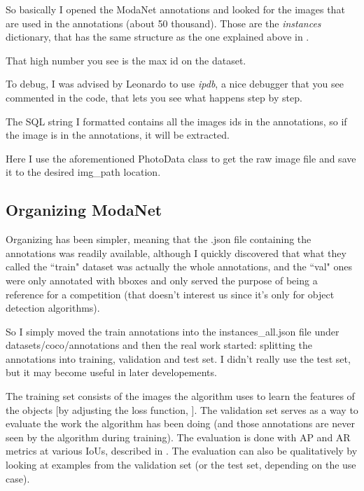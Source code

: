 


So basically I opened the ModaNet annotations and looked for the images that are used in the annotations (about 50 thousand). Those are the \emph{instances} dictionary, that has the same structure as the one explained above in .

That high number you see is the max id on the dataset. 

To debug, I was advised by Leonardo to use \emph{ipdb}, a nice debugger that you see commented in the code, that lets you see what happens step by step.

The SQL string I formatted contains all the images ids in the annotations, so if the image is in the annotations, it will be extracted.



Here I use the aforementioned PhotoData class to get the raw image file and save it to the desired img\_path location.

\subsection{Organizing ModaNet}\label{s:ds-org-mn}

Organizing \modanet has been simpler, meaning that the .json file containing the annotations was readily available, although I quickly discovered that what they called the “train" dataset was actually the whole annotations, and the “val" ones were only annotated with bboxes and only served the purpose of being a reference for a competition (that doesn't interest us since it's only for object detection algorithms).

So I simply moved the train annotations into the instances\_all.json file under datasets/coco/annotations and then the real work started: splitting the annotations into training, validation and test set. I didn't really use the test set, but it may become useful in later developements.

The training set consists of the images the algorithm uses to learn the features of the objects [by adjusting the loss function, ]. 
The validation set serves as a way to evaluate the work the algorithm has been doing (and those annotations are never seen by the algorithm during training). The evaluation is done with AP and AR metrics at various IoUs, described in . The evaluation can also be qualitatively by looking at examples from the validation set (or the test set, depending on the use case).


